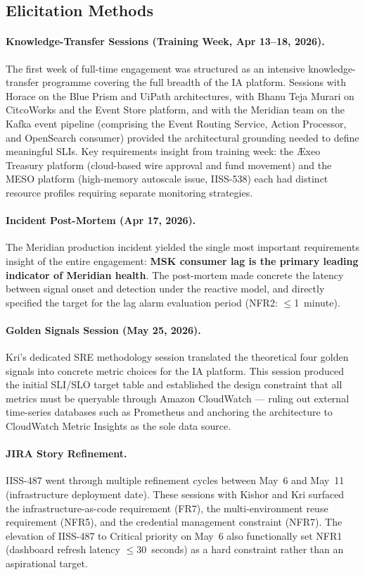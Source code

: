 \subsection{Elicitation Methods}

\paragraph{Knowledge-Transfer Sessions (Training Week, Apr 13--18, 2026).}
The first week of full-time engagement was structured as an intensive
knowledge-transfer programme covering the full breadth of the IA
platform. Sessions with Horace on the Blue Prism and UiPath
architectures, with Bhanu Teja Murari on CitcoWorks and the Event Store
platform, and with the Meridian team on the Kafka event pipeline
(comprising the Event Routing Service, Action Processor, and OpenSearch
consumer) provided the architectural grounding needed to define
meaningful SLIs. Key requirements insight from training week: the
\AE xeo Treasury platform (cloud-based wire approval and fund movement)
and the MESO platform (high-memory autoscale issue, IISS-538) each
had distinct resource profiles requiring separate monitoring strategies.

\paragraph{Incident Post-Mortem (Apr 17, 2026).}
The Meridian production incident yielded the single most important
requirements insight of the entire engagement: \textbf{MSK consumer
lag is the primary leading indicator of Meridian health}. The
post-mortem made concrete the latency between signal onset and
detection under the reactive model, and directly specified the target
for the lag alarm evaluation period (NFR2: $\leq$1~minute).

\paragraph{Golden Signals Session (May 25, 2026).}
Kri's dedicated SRE methodology session translated the theoretical
four golden signals into concrete metric choices for the IA platform.
This session produced the initial SLI/SLO target table and established
the design constraint that all metrics must be queryable through
Amazon CloudWatch --- ruling out external time-series databases such as
Prometheus and anchoring the architecture to CloudWatch Metric Insights
as the sole data source.

\paragraph{JIRA Story Refinement.}
IISS-487 went through multiple refinement cycles between May~6 and
May~11 (infrastructure deployment date). These sessions with Kishor
and Kri surfaced the infrastructure-as-code requirement (FR7), the
multi-environment reuse requirement (NFR5), and the credential
management constraint (NFR7). The elevation of IISS-487 to Critical
priority on May~6 also functionally set NFR1 (dashboard refresh
latency $\leq$30~seconds) as a hard constraint rather than an aspirational
target.

